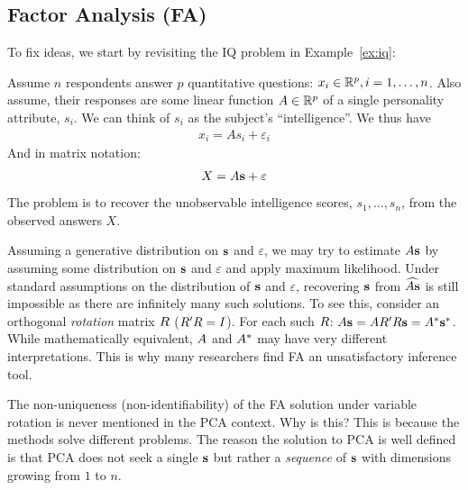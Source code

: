 \documentclass[12pt,a4paper]{article}
\begin{document}
\subsection{Factor Analysis (FA)}

To fix ideas, we start by revisiting the IQ problem in Example~\ref{ex:iq}:
\begin{example}
	
	Assume $n$ respondents answer $p$ quantitative questions: $x_i \in \mathbb{R}^p, i=1,\dots,n$. 
	Also assume, their responses are some linear function $A \in \mathbb{R}^p$ of a single personality attribute, $s_i$. 
	We can think of $s_i$ as the subject's ``intelligence''.
	We thus have 
	\begin{align}
	x_i = A s_i + \varepsilon_i
	\end{align}
	And in matrix notation:
	\begin{align}
	\label{eq:factor}
	X = A \mathbf{s} +\varepsilon
	\end{align}
	The problem is to recover the unobservable intelligence scores, $s_1,\dots,s_n$, from the observed answers $X$.	
\end{example}


Assuming a generative distribution on $\mathbf{s}$ and $\varepsilon$, we may try to estimate $A \mathbf{s}$ by assuming some distribution on $\mathbf{s}$ and $\varepsilon$ and apply maximum likelihood.
Under standard assumptions on the distribution of $\mathbf{s}$ and $\varepsilon$, recovering  $\mathbf{s}$ from $\widehat{A\mathbf{s}}$ is still impossible as there are infinitely many such solutions.
To see this, consider an orthogonal \emph{rotation} matrix $R$ ($R' R=I$). For each such $R$: $ A \mathbf{s}=A R' R \mathbf{s} = A^* \mathbf{s}^*$.
While mathematically equivalent, $A$ and $A^*$ may have very different interpretations. 
This is why many researchers find FA an unsatisfactory inference tool.


\begin{remark}
	The non-uniqueness (non-identifiability) of the FA solution under variable rotation is never mentioned in the PCA context. Why is this?
	This is because the methods solve different problems. 
	The reason the solution to PCA is well defined is that PCA does not seek a single $\mathbf{s}$ but rather a \emph{sequence} of $\mathbf{s}$ with dimensions growing from $1$ to $n$. 
\end{remark}
\end{document}
